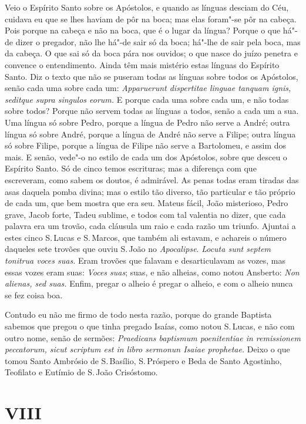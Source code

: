 Veio o Espírito Santo sobre os Apóstolos, e quando as línguas desciam do
Céu, cuidava eu que se lhes haviam de pôr na boca; mas elas foram"-se pôr
na cabeça. Pois porque na cabeça e não na boca, que é o lugar da língua?
Porque o que há"-de dizer o pregador, não lhe há"-de sair só da boca;
há"-lhe de sair pela boca, mas da cabeça. O que sai só da boca pára nos
ouvidos; o que nasce do juízo penetra e convence o entendimento. Ainda
têm mais mistério estas línguas do Espírito Santo. Diz o texto que não
se puseram
todas as línguas sobre todos os Apóstolos, senão cada uma sobre cada um:
\emph{Apparuerunt dispertitae linguae tanquam ignis, seditque supra
singulos eorum.} E porque cada uma sobre cada um, e
não todas sobre todos? Porque não servem todas as línguas a todos,
senão a cada um a sua. Uma língua só sobre Pedro, porque a língua de
Pedro não serve a André; outra língua só sobre André, porque a língua de
André não serve a Filipe; outra língua só sobre Filipe, porque a língua
de Filipe não serve a Bartolomeu, e assim dos mais. E senão, vede"-o no
estilo de cada um dos Apóstolos, sobre que desceu o Espírito Santo. Só
de cinco temos escrituras; mas a diferença com que escreveram, como
sabem os doutos, é admirável. As penas todas eram tiradas das asas
daquela pomba divina; mas o estilo tão diverso, tão particular e tão
próprio de cada um, que bem mostra que era seu. Mateus fácil, João
misterioso, Pedro grave, Jacob forte, Tadeu sublime, e todos com tal
valentia no dizer, que cada palavra era um trovão, cada cláusula um raio
e cada razão um triunfo. Ajuntai a estes cinco S.\,Lucas e S.\,Marcos, que
também ali estavam, e achareis o número daqueles sete trovões que
ouviu S.\,João no \emph{Apocalipse}. \emph{Locuta sunt septem tonitrua
voces suas.} Eram trovões que falavam e desarticulavam as vozes, mas
essas vozes eram suas: \emph{Voces suas}; suas, e não alheias, como
notou Ansberto: \emph{Non alienas, sed suas.} Enfim, pregar o alheio é
pregar o alheio, e com o alheio nunca se fez coisa boa.

Contudo eu não me firmo de todo nesta razão, porque do grande
Baptista sabemos que pregou o que tinha pregado Isaías, como notou S.\,Lucas, e não com outro nome, senão de sermões: \emph{Praedicans
baptismum poenitentiae in remissionem peccatorum, sicut scriptum est in
libro sermonun Isaiae prophetae.} Deixo o que tomou Santo Ambrósio de
S.\,Basílio, S.\,Próspero e Beda de Santo Agostinho, Teofilato e Eutímio
de S.\,João Crisóstomo.

\section*{VIII}

